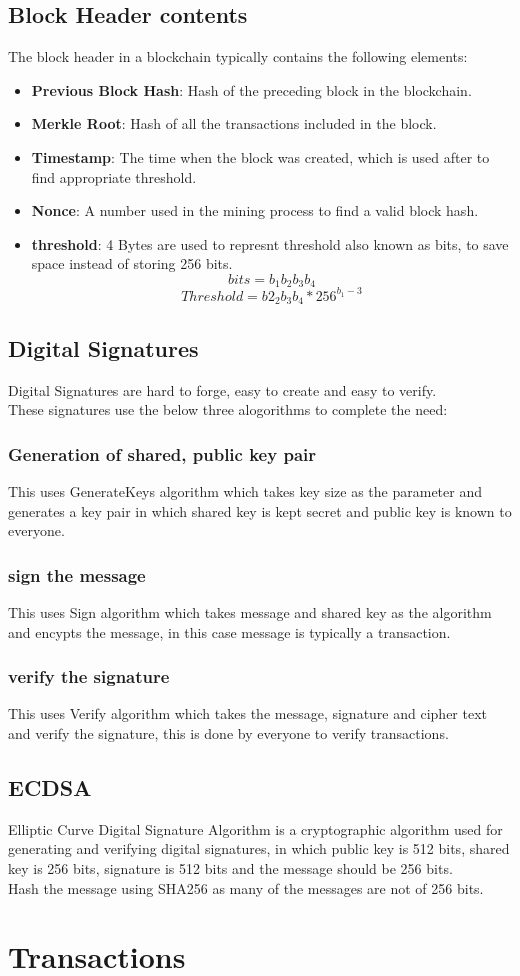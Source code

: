 \documentclass{report}
\begin{document}
\subsection{Block Header contents}
The block header in a blockchain typically contains the following elements:
\begin{itemize}
    \item \textbf{Previous Block Hash}: Hash of the preceding block in the blockchain.
    \item \textbf{Merkle Root}: Hash of all the transactions included in the block.
    \item \textbf{Timestamp}: The time when the block was created, which is used after to find appropriate threshold.
    \item \textbf{Nonce}: A number used in the mining process to find a valid block hash.
    \item \textbf{threshold}: 4 Bytes are used to represnt threshold also known as bits, to save space instead of storing 256 bits.
    $$bits = b_1b_2b_3b_4$$
    $$Threshold = b2_2b_3b_4 * 256^{b_1 - 3}$$
\end{itemize}
\subsection{Digital Signatures}
Digital Signatures are hard to forge, easy to create and easy to verify. \\
These signatures use the below three alogorithms to complete the need:
\subsubsection{Generation of shared, public key pair}
This uses GenerateKeys algorithm which takes key size as the parameter and generates a key pair in which shared key is kept secret and public key is known to everyone.
\subsubsection{sign the message}
This uses Sign algorithm which takes message and shared key as the algorithm and encypts the message, in this case message is typically a transaction. 
\subsubsection{verify the signature}
This uses Verify algorithm which takes the message, signature and cipher text and verify the signature, this is done by everyone to verify transactions.
\subsection{ECDSA}
Elliptic Curve Digital Signature Algorithm is a cryptographic algorithm used for generating and verifying digital signatures, in which public key is 512 bits, shared key is 256 bits, signature is 512 bits and the message should be 256 bits.\\
Hash the message using SHA256 as many of the messages are not of 256 bits.
\section{Transactions}
\end{document}

